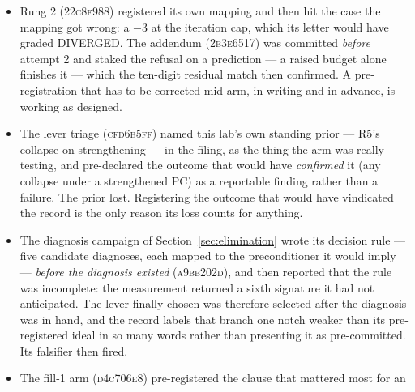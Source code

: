 \documentclass[11pt,a4paper]{article}
\newcommand{\commit}[1]{\textsc{\small #1}}
\begin{document}
\begin{itemize}
(\commit{12d3a7a3}, \commit{054d10b2}, \commit{13c244cd}, \commit{31eede16},
\commit{4aef4a2f}), each committed before the launch it governs, two of them carrying
addenda committed before the attempt \emph{they} govern. Its scoring is the point:
the registered \emph{not evaluable} branch fired \textbf{three times} --- twice on arms that
never reached an adjoint, once on a finite-difference step below its own measured noise floor
--- and each is reported as not evaluable with its blocker named, rather than read into the
verdict the campaign wanted. The negative control was registered \emph{with its falsifier}
(``if the control converges, the token story is wrong and the finding reverts to open''), and
the FD arm's pass rule (\(\ge2\) evaluable components, all evaluable ones inside 5\%) was
fixed before the components were.
\item Rung 2 (\commit{22c8e988}) registered its own mapping and then hit the case the mapping
got wrong: a \(-3\) at the iteration cap, which its letter would have graded DIVERGED. The
addendum (\commit{2b3e6517}) was committed \emph{before} attempt 2 and staked the refusal on a
prediction --- a raised budget alone finishes it --- which the ten-digit residual match then
confirmed. A pre-registration that has to be corrected mid-arm, in writing and in advance, is
working as designed.
\item The lever triage (\commit{cfd6b5ff}) named this lab's own standing prior --- R5's
collapse-on-strengthening --- in the filing, as the thing the arm was really testing, and
pre-declared the outcome that would have \emph{confirmed} it (any collapse under a strengthened
PC) as a reportable finding rather than a failure. The prior lost. Registering the outcome that
would have vindicated the record is the only reason its loss counts for anything.
\item The diagnosis campaign of Section~\ref{sec:elimination} wrote its decision rule ---
five candidate diagnoses, each mapped to the preconditioner it would imply --- \emph{before the
diagnosis existed} (\commit{a9bb202d}), and then reported that the rule was incomplete: the
measurement returned a sixth signature it had not anticipated. The lever finally chosen was
therefore selected after the diagnosis was in hand, and the record labels that branch one notch
weaker than its pre-registered ideal in so many words rather than presenting it as
pre-committed. Its falsifier then fired.
\item The fill-1 arm (\commit{d4c706e8}) pre-registered the clause that mattered most for an

\end{itemize}
\end{document}
